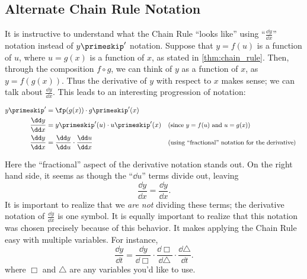 

\subsection{Alternate Chain Rule Notation}

It is instructive to understand what the  Chain Rule ``looks like'' using ``$\frac{\dd y}{\dd x}$'' notation instead of $y\primeskip'$ notation.  Suppose that $y=f(u)$ is a function of $u$, where $u=g(x)$ is a function of $x$, as stated in \autoref{thm:chain_rule}.  Then, through the composition $f \circ g$, we can think of $y$ as a function of $x$, as $y=f(g(x))$. Thus the derivative of $y$ with respect to $x$ makes sense; we can talk about $\frac{\dd y}{\dd x}.$  This leads to an interesting progression of notation:

\begin{align*}
 y\primeskip'
 &= \fp(g(x))\cdot g\primeskip'(x) \\
 \frac{\dd y}{\dd x} &= y\primeskip'(u) \cdot u\primeskip'(x)
 &&\text{\small (since $y=f(u)$ and $u=g(x)$)}\\
 \frac{\dd y}{\dd x} &= \frac{\dd y}{\dd u} \cdot \frac{\dd u}{\dd x}
 &&\text{\small (using ``fractional'' notation for the derivative)}
\end{align*}


Here the ``fractional'' aspect of the derivative notation stands out. On the right hand side, it seems as though the ``$\dd u$'' terms divide out, leaving
\[\frac{\dd y}{\dd x} = \frac{\dd y}{\dd x}.\]
It is important to realize that we \emph{are not} dividing these terms; the derivative notation of $\frac{\dd y}{\dd x}$ is one symbol. It is equally important to realize that this notation was chosen precisely because of this behavior. It makes applying the Chain Rule easy with multiple variables. For instance,
%
\[
 \frac{\dd y}{\dd t}
 =\frac{\dd y}{\dd\Box}\cdot\frac{\dd\Box}{\dd\triangle}\cdot\frac{\dd\triangle}{\dd t}.
\]
where $\Box$ and $\triangle$ are any variables you'd like to use.

